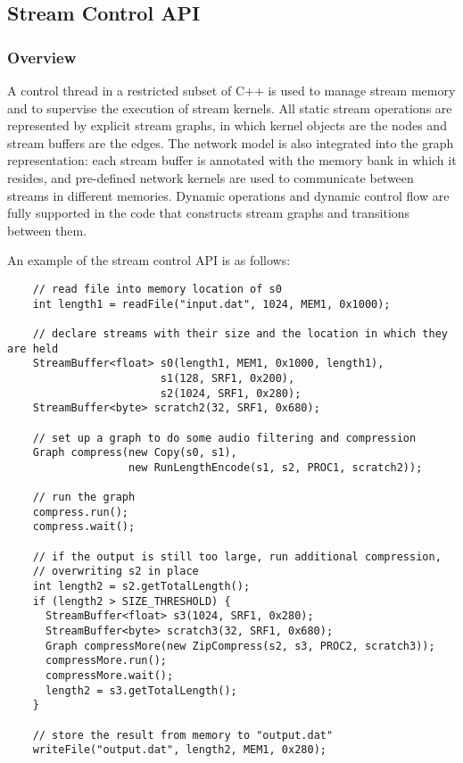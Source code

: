 \subsection{Stream Control API}
\label{sec:processor}

\subsubsection{Overview}
\label{sec:streamover}

A control thread in a restricted subset of C++ is used to manage stream memory and to supervise
the execution of stream kernels.  All static stream operations are represented by explicit
stream graphs, in which kernel objects are the nodes and stream buffers are the edges.  The
network model is also integrated into the graph representation: each stream buffer is annotated
with the memory bank in which it resides, and pre-defined network kernels are used to
communicate between streams in different memories.  Dynamic operations and dynamic control flow
are fully supported in the code that constructs stream graphs and transitions between them.

An example of the stream control API is as follows:
{\small
\begin{verbatim}
    // read file into memory location of s0
    int length1 = readFile("input.dat", 1024, MEM1, 0x1000);

    // declare streams with their size and the location in which they are held
    StreamBuffer<float> s0(length1, MEM1, 0x1000, length1), 
                        s1(128, SRF1, 0x200), 
                        s2(1024, SRF1, 0x280);
    StreamBuffer<byte> scratch2(32, SRF1, 0x680);

    // set up a graph to do some audio filtering and compression
    Graph compress(new Copy(s0, s1),
                   new RunLengthEncode(s1, s2, PROC1, scratch2));

    // run the graph
    compress.run();
    compress.wait();

    // if the output is still too large, run additional compression, 
    // overwriting s2 in place
    int length2 = s2.getTotalLength();
    if (length2 > SIZE_THRESHOLD) {
      StreamBuffer<float> s3(1024, SRF1, 0x280);
      StreamBuffer<byte> scratch3(32, SRF1, 0x680);
      Graph compressMore(new ZipCompress(s2, s3, PROC2, scratch3));
      compressMore.run();
      compressMore.wait();
      length2 = s3.getTotalLength();
    }

    // store the result from memory to "output.dat"
    writeFile("output.dat", length2, MEM1, 0x280);
\end{verbatim}}


